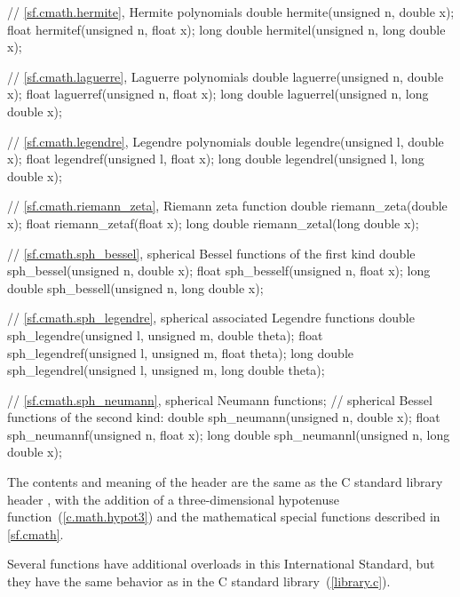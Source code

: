 \begin{codeblock}
{  // \ref{sf.cmath.hermite}, Hermite polynomials
  double       hermite(unsigned n, double x);
  float        hermitef(unsigned n, float x);
  long double  hermitel(unsigned n, long double x);

  // \ref{sf.cmath.laguerre}, Laguerre polynomials
  double       laguerre(unsigned n, double x);
  float        laguerref(unsigned n, float x);
  long double  laguerrel(unsigned n, long double x);

  // \ref{sf.cmath.legendre}, Legendre polynomials
  double       legendre(unsigned l, double x);
  float        legendref(unsigned l, float x);
  long double  legendrel(unsigned l, long double x);

  // \ref{sf.cmath.riemann_zeta}, Riemann zeta function
  double       riemann_zeta(double x);
  float        riemann_zetaf(float x);
  long double  riemann_zetal(long double x);

  // \ref{sf.cmath.sph_bessel}, spherical Bessel functions of the first kind
  double       sph_bessel(unsigned n, double x);
  float        sph_besself(unsigned n, float x);
  long double  sph_bessell(unsigned n, long double x);

  // \ref{sf.cmath.sph_legendre}, spherical associated Legendre functions
  double       sph_legendre(unsigned l, unsigned m, double theta);
  float        sph_legendref(unsigned l, unsigned m, float theta);
  long double  sph_legendrel(unsigned l, unsigned m, long double theta);

  // \ref{sf.cmath.sph_neumann}, spherical Neumann functions;
  // spherical Bessel functions of the second kind:
  double       sph_neumann(unsigned n, double x);
  float        sph_neumannf(unsigned n, float x);
  long double  sph_neumannl(unsigned n, long double x);
}
\end{codeblock}

\pnum
The contents and meaning of the header 
are the same as the C standard library header ,
with the addition of
a three-dimensional hypotenuse function~(\ref{c.math.hypot3}) and
the mathematical special functions described in \ref{sf.cmath}.
\begin{note}
Several functions have additional overloads in this International Standard,
but they have the same behavior as in the C standard library~(\ref{library.c}).
\end{note}


